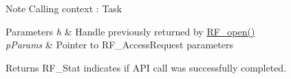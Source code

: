 \begin{DoxyNote}{Note}
Calling context \+: Task
\end{DoxyNote}

\begin{DoxyParams}{Parameters}
{\em h} & Handle previously returned by \hyperlink{_r_f_8h_a13a7c6f5a2b797e0aac18fecfaba6f64}{R\+F\+\_\+open()} \\
\hline
{\em p\+Params} & Pointer to R\+F\+\_\+\+Access\+Request parameters \\
\hline
\end{DoxyParams}
\begin{DoxyReturn}{Returns}
R\+F\+\_\+\+Stat indicates if A\+P\+I call was successfully completed. 
\end{DoxyReturn}
